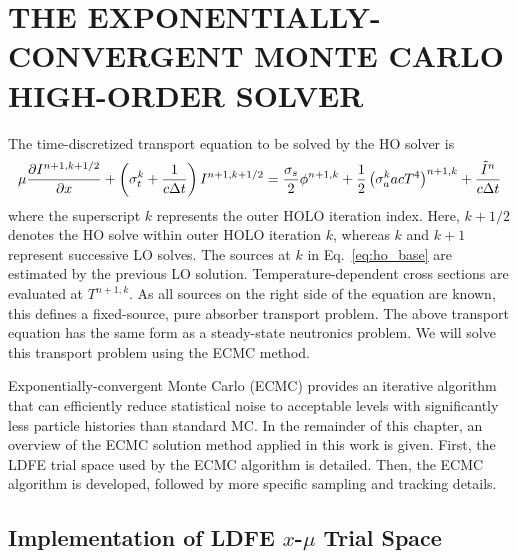 
\chapter{\uppercase {The Exponentially-Convergent Monte Carlo High-Order Solver}}
\label{chp:ho}

The time-discretized transport equation to be solved by the HO solver is
\begin{equation}\label{eq:ho_base}
\mu \frac{\partial I^{n+1,k+1/2}}{\partial x} + \left(\sigma_t^k + \frac{1}{c \Delta t }\right)
I^{n+1,k+1/2}
= \frac{\sigma_s}{2} \phi^{n+1,k} +\frac{1}{2} \left(\sigma_a^k a c T^4
\right)^{n+1,k} + \frac{\tilde I^n}{c\Delta t} 
\end{equation}
where the superscript $k$ represents the outer HOLO iteration index.  Here, $k+1/2$ denotes the
HO solve within outer HOLO iteration $k$, whereas $k$ and $k+1$ represent successive LO
solves. The sources at $k$ in Eq.~\eqref{eq:ho_base} are estimated by the previous LO
solution. Temperature-dependent cross sections are
evaluated at $T^{n+1,k}$.  As all sources on the right side of the equation are known,
this defines a fixed-source, pure absorber transport problem.  The above transport equation has
the same form as a steady-state neutronics problem.  We will solve
this transport problem using the ECMC method. 

Exponentially-convergent Monte Carlo (ECMC)\cite{jake,ans_2014} provides an iterative algorithm that can efficiently
reduce statistical noise to acceptable levels with
significantly less particle histories than standard MC.
In the remainder of this chapter, an overview of
the ECMC solution method applied in this work is given.  First, the LDFE trial
space used by the ECMC algorithm is detailed.  Then, the ECMC algorithm is
developed, followed by more specific sampling and tracking details.  

\section{Implementation of LDFE $x$-$\mu$ Trial Space}

